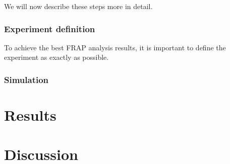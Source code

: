 \documentclass[a4paper,10pt,twocolumn]{article}
\begin{document}
We will now describe these steps more in detail.

\subsubsection{Experiment definition}

To achieve the best FRAP analysis results, it is important to define the experiment as exactly as possible.


\subsubsection{Simulation}






\section{Results}

\section{Discussion}
\end{document}
